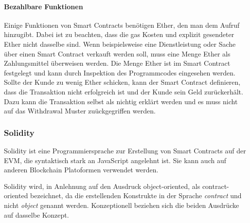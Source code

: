 \paragraph{Bezahlbare Funktionen}
Einige Funktionen von Smart Contracts benötigen Ether, den man dem Aufruf hinzugibt. Dabei ist zu beachten, dass die gas Kosten und explizit gesendeter Ether nicht dasselbe sind. Wenn beispielsweise eine Dienstleistung oder Sache über einen Smart Contract verkauft werden soll, muss eine Menge Ether als Zahlungsmittel überweisen werden. Die Menge Ether ist im Smart Contract festgelegt und kann durch Inspektion des Programmcodes eingesehen werden. Sollte der Kunde zu wenig Ether schicken, kann der Smart Contract definieren, dass die Transaktion nicht erfolgreich ist und der Kunde sein Geld zurückerhält. Dazu kann die Transaktion selbst als nichtig erklärt werden und es muss nicht auf das Withdrawal Muster zuückgegriffen werden.\cite{solidity.readthedocs.io}

\subsubsection{Solidity}
Solidity ist eine Programmiersprache zur Erstellung von Smart Contracts auf der \acrfull{EVM}, die syntaktisch stark an JavaScript angelehnt ist. Sie kann auch auf anderen Blockchain Platoformen verwendet werden.\cite{cryptocoinnews.com/smart-contract-bitcoin,github.com/hyperledger/burrow}

Solidity wird, in Anlehnung auf den Ausdruck object-oriented, als contract-oriented bezeichnet, da die erstellenden Konstrukte in der Sprache \emph{contract} und nicht \emph{object} genannt werden. Konzeptionell beziehen sich die beiden Ausdrücke auf dasselbe Konzept.

